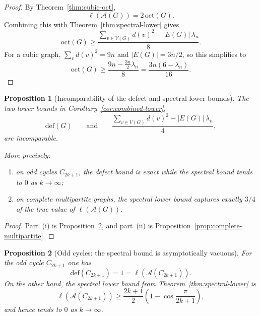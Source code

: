 \documentclass[11pt]{article}
\newtheorem{proposition}{Proposition}
\theoremstyle{plain}
\begin{document}
\begin{proof}
By Theorem~\ref{thm:cubic-oct},
\[
\ell(\mathcal A(G))=2\,\mathrm{oct}(G).
\]
Combining this with Theorem~\ref{thm:spectral-lower} gives
\[
\mathrm{oct}(G)
\ge
\frac{\sum_{v\in V(G)} d(v)^2-|E(G)|\,\lambda_n}{8}.
\]
For a cubic graph, $\sum_v d(v)^2=9n$ and $|E(G)|=3n/2$, so this simplifies to
\[
\mathrm{oct}(G)\ge \frac{9n-\frac{3n}{2}\lambda_n}{8}
=
\frac{3n(6-\lambda_n)}{16}.
\]
\end{proof}


\begin{proposition}[Incomparability of the defect and spectral lower bounds]
\label{prop:incomparable-bounds}
The two lower bounds in Corollary~\ref{cor:combined-lower},
\[
\mathrm{def}(G)
\qquad\text{and}\qquad
\frac{\sum_{v\in V(G)} d(v)^2-|E(G)|\,\lambda_n}{4},
\]
are incomparable.

More precisely:
\begin{enumerate}\itemsep2pt
\item[(i)] on odd cycles $C_{2k+1}$, the defect bound is exact while the
spectral bound tends to $0$ as $k\to\infty$;
\item[(ii)] on complete multipartite graphs, the spectral lower bound captures
exactly $3/4$ of the true value of $\ell(\mathcal A(G))$.
\end{enumerate}
\end{proposition}

\begin{proof}
Part~(i) is Proposition~\ref{prop:odd-cycles-spectral-fail}, and part~(ii) is
Proposition~\ref{prop:complete-multipartite}.
\end{proof}

\begin{proposition}[Odd cycles: the spectral bound is asymptotically vacuous]
\label{prop:odd-cycles-spectral-fail}
For the odd cycle $C_{2k+1}$ one has
\[
\mathrm{def}(C_{2k+1})=1=\ell(\mathcal A(C_{2k+1})).
\]
On the other hand, the spectral lower bound from
Theorem~\ref{thm:spectral-lower} is
\[
\ell(\mathcal A(C_{2k+1}))
\ge
\frac{2k+1}{2}\left(1-\cos\frac{\pi}{2k+1}\right),
\]
and hence tends to $0$ as $k\to\infty$.
\end{proposition}
\end{document}
